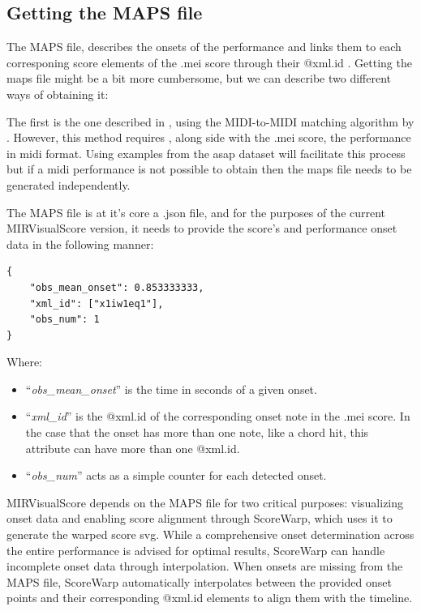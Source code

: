 \subsection{Getting the MAPS file}
The MAPS file, describes the onsets of the performance and links them to each corresponing score elements of the .mei score through their @xml.id . Getting the maps file might be a bit more cumbersome, but we can describe two different ways of obtaining it: 

The first is the one described in \citet{goeblLetsScoreWarpAgain2025a}, using the MIDI-to-MIDI matching algorithm by \citet{nakamuraPERFORMANCEERRORDETECTION}. However,  this method requires , along side with the .mei score, the performance in midi format. Using examples from the asap dataset \citep{peterAutomaticNoteLevelScoretoPerformance2023} will facilitate this process but if a midi performance is not possible to obtain then the maps file needs to be generated independently.

The MAPS file is at it's core a .json file, and for the purposes of the current MIRVisualScore version, it needs to provide the score's and performance onset data in the following manner:

\begin{verbatim}
{
    "obs_mean_onset": 0.853333333,
    "xml_id": ["x1iw1eq1"],
    "obs_num": 1
}
\end{verbatim}

Where: 

\begin{itemize}
    \item ``\textit{obs\_mean\_onset}'' is the time in seconds of a given onset.
    \item ``\textit{xml\_id}'' is the @xml.id of the corresponding onset note in the .mei score. In the case that the onset has more than one note, like a chord hit, this attribute can have more than one @xml.id. 
    \item ``\textit{obs\_num}'' acts as a simple counter for each detected onset. 
\end{itemize} 

MIRVisualScore depends on the MAPS file for two critical purposes: visualizing onset data and enabling score alignment through ScoreWarp, which uses it to generate the warped score svg. While a comprehensive onset determination across the entire performance is advised for optimal results, ScoreWarp can handle incomplete onset data through interpolation. When onsets are missing from the MAPS file, ScoreWarp automatically interpolates between the provided onset points and their corresponding @xml.id elements to align them with the timeline. 

